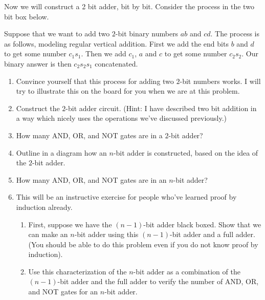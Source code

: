 Now we will construct a 2 bit adder, bit by bit. Consider the process in the two bit box below.

\begin{tcolorbox}
Suppose that we want to add two $2$-bit binary numbers $ab$ and $cd$. The process is as follows, modeling regular vertical addition. First we add the end bits $b$ and $d$ to get some number $c_1s_1$. Then we add $c_1$, $a$ and $c$ to get some number $c_2s_2$. Our binary answer is then $c_2s_2s_1$ concatenated.
\end{tcolorbox}

\begin{enumerate}
    \item Convince yourself that this process for adding two $2$-bit numbers works. I will try to illustrate this on the board for you when we are at this problem.
    
    \item Construct the $2$-bit adder circuit. (Hint: I have described two bit addition in a way which nicely uses the operations we've discussed previously.)
    
    \item How many AND, OR, and NOT gates are in a $2$-bit adder?
    
    \item Outline in a diagram how an $n$-bit adder is constructed, based on the idea of the $2$-bit adder.
    
    \item How many AND, OR, and NOT gates are in an $n$-bit adder?
    
    \item This will be an instructive exercise for people who've learned proof by induction already. \begin{enumerate}
        \item First, suppose we have the $(n-1)$-bit adder black boxed. Show that we can make an $n$-bit adder using this $(n-1)$-bit adder and a full adder. (You should be able to do this problem even if you do not know proof by induction).
        \item Use this characterization of the $n$-bit adder as a combination of the $(n-1)$-bit adder and the full adder to verify the number of AND, OR, and NOT gates for an $n$-bit adder.
    \end{enumerate} 
\end{enumerate}